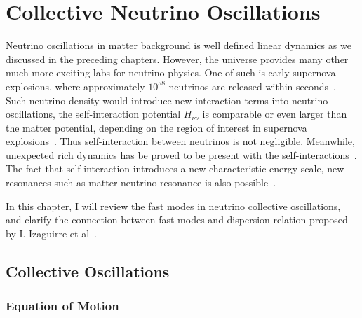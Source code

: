 
\chapter{\label{chap:dr}Collective Neutrino Oscillations}

Neutrino oscillations in matter background is well defined linear dynamics as we discussed in the preceding chapters. However, the universe provides many other much more exciting labs for neutrino physics. One of such is early supernova explosions, where approximately $10^{58}$ neutrinos are released within seconds~\cite{Bahcall1987}. Such neutrino density would introduce new interaction terms into neutrino oscillations, the self-interaction potential $H_{\nu\nu}$ is comparable or even larger than the matter potential, depending on the region of interest in supernova explosions~\cite{Flowers1976a}. Thus self-interaction between neutrinos is not negligible. Meanwhile, unexpected rich dynamics has be proved to be present with the self-interactions~\cite{Duan2010, Duan2006}. The fact that self-interaction introduces a new characteristic energy scale, new resonances such as matter-neutrino resonance is also possible~\cite{Malkus2014, Vaananen2015, Wu2015}.

In this chapter, I will review the fast modes in neutrino collective oscillations, and clarify the connection between fast modes and dispersion relation proposed by I. Izaguirre et al~\cite{Izaguirre2016a}.



\section{\label{chap:dr-sec:collective}Collective Oscillations}





\subsection{Equation of Motion}

